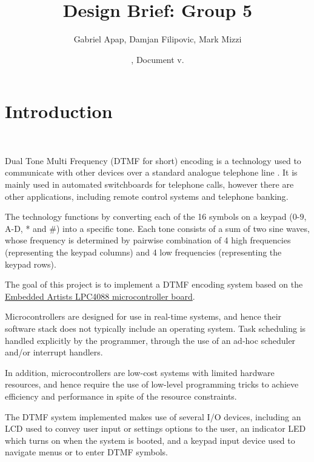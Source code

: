 \documentclass[11pt,a4paper,twocolumn]{scrartcl}
\title{Design Brief: Group 5}
\author{
   Gabriel Apap,
   Damjan Filipovic,
   Mark Mizzi
   }
\date{\svnMaxToday, Document v.\svnInfoMaxRevision}
\begin{document}
\maketitle


\section{Introduction}~\label{introduction}

   Dual Tone Multi Frequency (DTMF for short) encoding is a technology used to communicate with other devices over a standard analogue telephone line \cite{sl:an218}. It is mainly used in automated switchboards for telephone calls, however there are other applications, including remote control systems and telephone banking\cite{sl:an218}.

   The technology functions by converting each of the 16 symbols on a keypad ($0$-$9$, A-D, * and \#) into a specific tone. Each tone consists of a sum of two sine waves, whose frequency is determined by pairwise combination of 4 high frequencies (representing the keypad columns) and 4 low frequencies (representing the keypad rows)\cite{sl:an218}.

   The goal of this project is to implement a DTMF encoding system based on the \href{https://www.embeddedartists.com/products/lpc4088-quickstart-board/}{Embedded Artists LPC4088 microcontroller board}.

   Microcontrollers are designed for use in real-time systems, and hence their software stack does not typically include an operating system. Task scheduling is handled explicitly by the programmer, through the use of an ad-hoc scheduler and/or interrupt handlers.

   In addition, microcontrollers are low-cost systems with limited hardware resources, and hence require the use of low-level programming tricks to achieve efficiency and performance in spite of the resource constraints.
   
   The DTMF system implemented makes use of several I/O devices, including an LCD used to convey user input or settings options to the user,
   an indicator LED which turns on when the system is booted, and a keypad input device used to navigate menus or to enter DTMF symbols.
\end{document}
